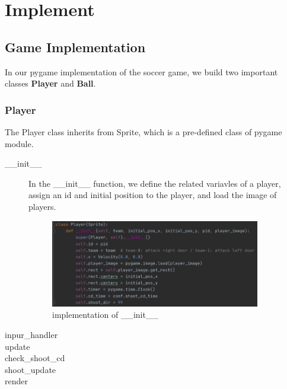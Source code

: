 \documentclass[14pt]{extarticle}
\begin{document}

\section{Implement}

\subsection{Game Implementation}

In our pygame implementation of the soccer game, we build two important classes \textbf{Player} and \textbf{Ball}.

\subsubsection{Player}
The Player class inherits from Sprite, which is a pre-defined class of pygame module.
\begin{description}
	\item[\_\_init\_\_]
	In the \_\_init\_\_ function, we define the related variavles of a player, assign an id and initial position to the player, and load the image of players.
	\begin{figure}[H]
		\begin{center}
			\includegraphics[width=0.9\textwidth]{Player_init} %
			\caption{implementation of \_\_init\_\_}
		\end{center}
	\end{figure}
	\item[inpur\_handler]
	
	\item[update]
	
	\item[check\_shoot\_cd]
	
	\item[shoot\_update]
	
	\item[render]
	
\end{description}
\end{document}
